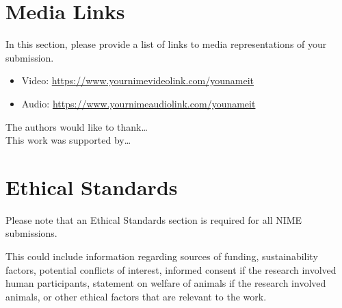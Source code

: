 \documentclass{nimemusic}
\begin{document}
\section{Media Links}

In this section, please provide a list of links to media representations of your submission.

\begin{itemize}
	\item Video: \url{https://www.yournimevideolink.com/younameit}
	\item Audio: \url{https://www.yournimeaudiolink.com/younameit}
\end{itemize}

\begin{acks}
The authors would like to thank\ldots
\\
This work was supported by\ldots
\end{acks}

\section*{Ethical Standards}

Please note that an Ethical Standards section is required for all NIME submissions.

This could include information regarding sources of funding, sustainability factors, potential conflicts of interest,  informed consent if the research involved human participants, statement on welfare of animals if the research involved animals, or other ethical factors that are relevant to the work.



\end{document}
